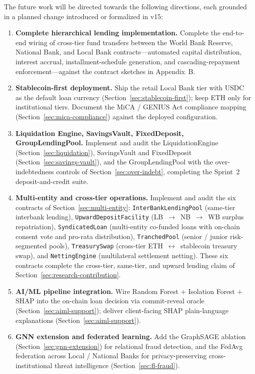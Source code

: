 \documentclass[12pt,a4paper]{report}
\begin{document}
The future work will be directed towards the following directions, each grounded in a planned change introduced or formalized in v15:
\label{sec:future-work}

\begin{enumerate}[noitemsep]
\item \textbf{Complete hierarchical lending implementation.} Complete the end-to-end wiring of cross-tier fund transfers between the World Bank Reserve, National Bank, and Local Bank contracts---automated capital distribution, interest accrual, installment-schedule generation, and cascading-repayment enforcement---against the contract sketches in Appendix~B.
\item \textbf{Stablecoin-first deployment.} Ship the retail Local Bank tier with USDC as the default loan currency (Section~\ref{sec:stablecoin-first}); keep ETH only for institutional tiers. Document the MiCA / GENIUS Act compliance mapping (Section~\ref{sec:mica-compliance}) against the deployed configuration.
\item \textbf{Liquidation Engine, SavingsVault, FixedDeposit, GroupLendingPool.} Implement and audit the LiquidationEngine (Section~\ref{sec:liquidation}), SavingsVault and FixedDeposit (Section~\ref{sec:savings-vault}), and the GroupLendingPool with the over-indebtedness controls of Section~\ref{sec:over-indebt}, completing the Sprint~2 deposit-and-credit suite.
\item \textbf{Multi-entity and cross-tier operations.} Implement and audit the six contracts of Section~\ref{sec:multi-entity}: \texttt{InterBankLendingPool} (same-tier interbank lending), \texttt{UpwardDepositFacility} (LB~$\to$~NB~$\to$~WB surplus repatriation), \texttt{SyndicatedLoan} (multi-entity co-funded loans with on-chain consent vote and pro-rata distribution), \texttt{TranchedPool} (senior / junior risk-segmented pools), \texttt{TreasurySwap} (cross-tier ETH~$\leftrightarrow$~stablecoin treasury swap), and \texttt{NettingEngine} (multilateral settlement netting). These six contracts complete the cross-tier, same-tier, and upward lending claim of Section~\ref{sec:research-contribution}.
\item \textbf{AI/ML pipeline integration.} Wire Random Forest + Isolation Forest + SHAP into the on-chain loan decision via commit-reveal oracle (Section~\ref{sec:aiml-support}); deliver client-facing SHAP plain-language explanations (Section~\ref{sec:aiml-support}).
\item \textbf{GNN extension and federated learning.} Add the GraphSAGE ablation (Section~\ref{sec:gnn-extension}) for relational fraud detection, and the FedAvg federation across Local / National Banks for privacy-preserving cross-institutional threat intelligence (Section~\ref{sec:fl-fraud}).

\end{enumerate}
\end{document}
